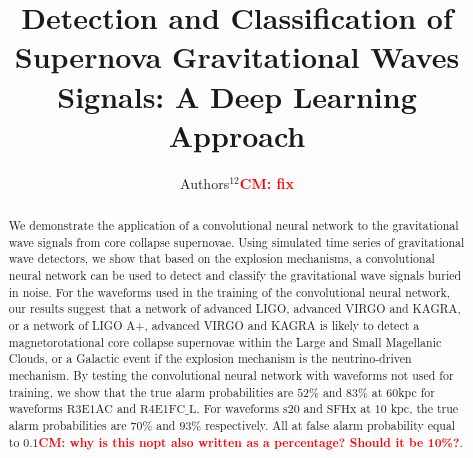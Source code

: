 \documentclass[aps,twocolumn,showpacs,groupedaddress, nofootinbib]{revtex4}  %
\newcommand{\dcc}{LIGO-P1700428}
\newcommand{\cm}[1]{\textbf{\textcolor{red}{CM: #1}}}
\begin{document}
\widetext


\title{Detection and Classification of Supernova Gravitational Waves Signals: A Deep Learning Approach}
 
 
\author{Authors$^{12}$\cm{fix}}

\begin{abstract}
We demonstrate the application of a convolutional neural network to the
gravitational wave signals from core collapse supernovae. Using simulated time
series of gravitational wave detectors, we show that based on the explosion
mechanisms, a convolutional neural network can be used to detect and classify
the gravitational wave signals buried in noise. For the waveforms used in the
training of the convolutional neural network, our results suggest that a
network of advanced LIGO, advanced VIRGO and KAGRA, or a network of LIGO A+,
advanced VIRGO and KAGRA is likely to detect a magnetorotational core collapse
supernovae within the Large and Small Magellanic Clouds, or a Galactic event if
the explosion mechanism is the neutrino-driven mechanism.  By testing the
convolutional neural network with waveforms not used for training, we show that
the true alarm probabilities are $52\%$ and $83\%$ at $60$kpc for waveforms
$\text{R3E1AC}$ and $\text{R4E1FC\_L}$.  For waveforms $\text{s}20$ and
$\text{SFHx}$ at $10$ kpc, the true alarm probabilities are $70\%$ and $93\%$
respectively. All at false alarm probability equal to $0.1$\cm{why is this nopt
also written as a percentage? Should it be 10\%?}.  \end{abstract}
\end{document}
